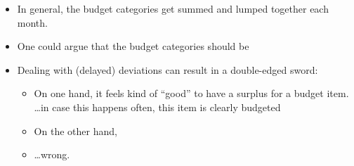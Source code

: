 \begin{itemize}
	\item In general, the budget categories get summed and lumped together each month.
	\item One could argue that the budget categories should be 
	\item Dealing with (delayed) deviations can result in a double-edged sword:
	\begin{itemize}
		\item On one hand, it feels kind of ``good'' to have a surplus for a budget item.\\
		\ldots in case this happens often, this item is clearly budgeted
		\item On the other hand, 
		\item \ldots  wrong.
	\end{itemize}
\end{itemize}


